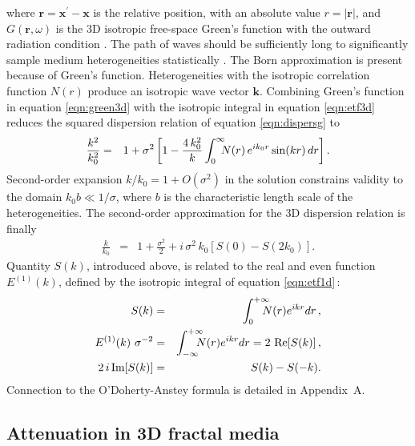 where $\mathbf{r} = \mathbf{x}^{\prime}-\mathbf{x}$ is the relative position, with an absolute value $r=|\mathbf{r}|$,
and $G(\mathbf{r},\omega)$ is the 3D isotropic free-space Green's function with the outward radiation condition 
\cite[]{Bleistein_CS01}.
The path of waves should be sufficiently long to significantly sample medium heterogeneities statistically \cite[]{Gist_94}.
The Born approximation is present because of Green's function.
Heterogeneities with the isotropic correlation function $N(r)$
produce an isotropic wave vector $\mathbf{k}$.
Combining Green's function in equation \ref{eqn:green3d} with the isotropic integral in equation \ref{eqn:etf3d} reduces 
the squared dispersion relation of equation \ref{eqn:dispersg} to
\begin{eqnarray}
\frac{k^2}{k_0^2} & = & 1 + \sigma^2\left[1 - \frac{4\,k_0^2}{k}\int_{0}^{\infty}\hspace{-2mm} N(r)\,e^{ik_0r}\sin(kr)\,dr\right].
\end{eqnarray}
Second-order expansion $k/k_0=1+O(\sigma^2)$ in the solution constrains validity to the domain 
$k_0b\ll 1/\sigma$, where $b$ is the characteristic length scale of the heterogeneities.
The second-order approximation for the 3D dispersion relation is finally
\begin{eqnarray}
\frac{k}{k_0} & = & 1 + \frac{\sigma^2}{2} + i\,\sigma^2\,k_0\left[S(0) - S(2k_0)\right]. \label{eqn:dispersc}
\end{eqnarray}
Quantity $S(k)$, introduced above, is related to the real and even function $E^{(1)}(k)$, defined by the isotropic integral of equation \ref{eqn:etf1d}\,:
\begin{eqnarray}
S(k) & = & \int_{0}^{+\infty}\hspace{-3mm}N(r)e^{ikr}dr\,, \label{eqn:defskint} \\
E^{(1)}(k)~\sigma^{-2} & = & \int_{-\infty}^{+\infty}\hspace{-3mm}N(r)e^{ikr}dr = 2~\mbox{Re}[S(k)]\,, \label{eqn:rsint} \\
2\,i\,\mbox{Im}[S(k)] & = & S(k) - S(-k).
\end{eqnarray}
Connection to the O'Doherty-Anstey formula is detailed in Appendix~A.


\subsection{Attenuation in 3D fractal media}


